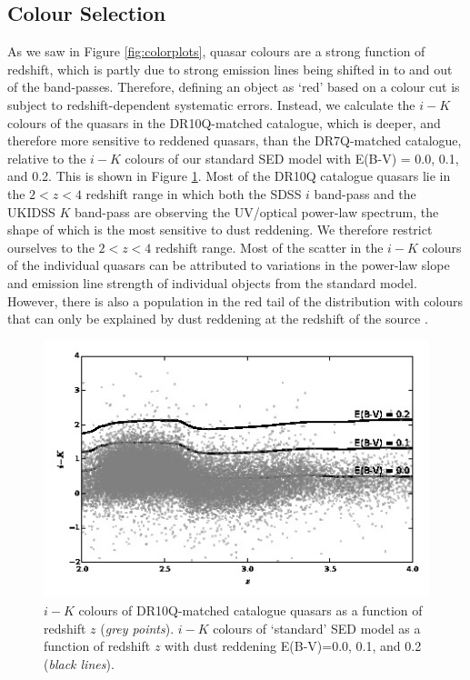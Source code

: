 \subsection{Colour Selection}

As we saw in Figure \ref{fig:colorplots}, quasar colours are a strong function of redshift, which is partly due to strong emission lines being shifted in to and out of the band-passes. Therefore, defining an object as `red' based on a colour cut is subject to redshift-dependent systematic errors. Instead, we calculate the $i-K$ colours of the quasars in the DR10Q-matched catalogue, which is deeper, and therefore more sensitive to reddened quasars, than the DR7Q-matched catalogue, relative to the $i-K$ colours of our standard SED model with E(B-V) = 0.0, 0.1, and 0.2. This is shown in Figure \ref{fig:ikvz}. Most of the DR10Q catalogue quasars lie in the $2 < z < 4$ redshift range in which both the SDSS $i$ band-pass and the UKIDSS $K$ band-pass are observing the UV/optical power-law spectrum, the shape of which is the most sensitive to dust reddening. We therefore restrict ourselves to the $2 < z < 4$ redshift range. Most of the scatter in the $i-K$ colours of the individual quasars can be attributed to variations in the power-law slope and emission line strength of individual objects from the standard model. However, there is also a population in the red tail of the distribution with colours that can only be explained by dust reddening at the redshift of the source \citep{hall04}. 

\begin{figure}
  \centering
  \includegraphics[width=\textwidth]{figures/chapter06/ikvz.jpg}
  \caption{$i-K$ colours of DR10Q-matched catalogue quasars as a function of redshift $z$ ({\it grey points}). $i - K$ colours of `standard' SED model as a function of redshift $z$ with dust reddening E(B-V)=0.0, 0.1, and 0.2 ({\it black lines}).}
  \label{fig:ikvz}
\end{figure}

